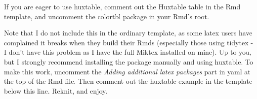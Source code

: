 \documentclass[11pt,preprint, authoryear]{elsarticle}
\numberwithin{equation}{section}
\numberwithin{figure}{section}
\numberwithin{table}{section}
\begin{document}
If you are eager to use huxtable, comment out the Huxtable table in the
Rmd template, and uncomment the colortbl package in your Rmd's root.

Note that I do not include this in the ordinary template, as some latex
users have complained it breaks when they build their Rmds (especially
those using tidytex - I don't have this problem as I have the full
Miktex installed on mine). Up to you, but I strongly recommend
installing the package manually and using huxtable. To make this work,
uncomment the \emph{Adding additional latex packages} part in yaml at
the top of the Rmd file. Then comment out the huxtable example in the
template below this line. Reknit, and enjoy.

 
  \providecommand{\huxb}[2]{\arrayrulecolor[RGB]{#1}\global\arrayrulewidth=#2pt}
  \providecommand{\huxvb}[2]{\color[RGB]{#1}\vrule width #2pt}
  \providecommand{\huxtpad}[1]{\rule{0pt}{#1}}
  \providecommand{\huxbpad}[1]{\rule[-#1]{0pt}{#1}}
\end{document}
